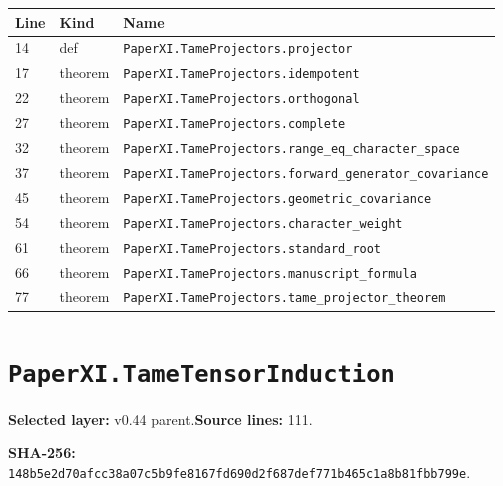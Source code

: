 \documentclass[10pt,oneside]{book}
\begin{document}
\begin{longtable}{@{}p{}p{}p{}@{}}\toprule Line&Kind&Name\\\midrule\endhead

14&def&\nolinkurl{PaperXI.TameProjectors.projector}\\

17&theorem&\nolinkurl{PaperXI.TameProjectors.idempotent}\\

22&theorem&\nolinkurl{PaperXI.TameProjectors.orthogonal}\\

27&theorem&\nolinkurl{PaperXI.TameProjectors.complete}\\

32&theorem&\nolinkurl{PaperXI.TameProjectors.range_eq_character_space}\\

37&theorem&\nolinkurl{PaperXI.TameProjectors.forward_generator_covariance}\\

45&theorem&\nolinkurl{PaperXI.TameProjectors.geometric_covariance}\\

54&theorem&\nolinkurl{PaperXI.TameProjectors.character_weight}\\

61&theorem&\nolinkurl{PaperXI.TameProjectors.standard_root}\\

66&theorem&\nolinkurl{PaperXI.TameProjectors.manuscript_formula}\\

77&theorem&\nolinkurl{PaperXI.TameProjectors.tame_projector_theorem}\\

\bottomrule\end{longtable}

\section{\texorpdfstring{\nolinkurl{PaperXI.TameTensorInduction}}{PaperXI.TameTensorInduction}}\label{module:PaperXI.TameTensorInduction}

\textbf{Selected layer:} v0.44 parent.\quad\textbf{Source lines:} 111.\par\textbf{SHA-256:} {\scriptsize\nolinkurl{148b5e2d70afcc38a07c5b9fe8167fd690d2f687def771b465c1a8b81fbb799e}}.

\end{document}
